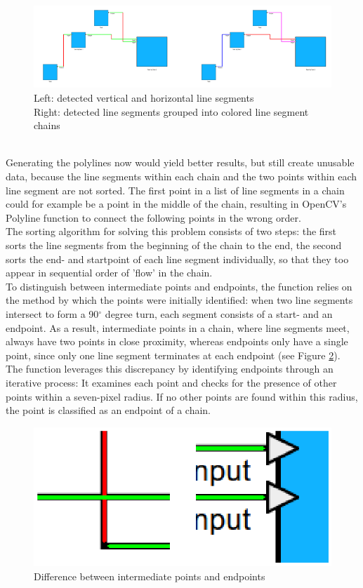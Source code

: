 \begin{figure}[h]
    \centering
    \includegraphics[width=\linewidth]{Pictures/chains_before_after.png}
    \caption{Left: detected vertical and horizontal line segments\\Right: detected line segments grouped into colored line segment chains}
    \label{fig_chains_before_after}
\end{figure}\\
Generating the polylines now would yield better results, but still create unusable data, because the line segments within each chain and the two points within each line segment are not sorted. The first point in a list of line segments in a chain could for example be a point in the middle of the chain, resulting in OpenCV's Polyline function to connect the following points in the wrong order.\\
The sorting algorithm for solving this problem consists of two steps: the first sorts the line segments from the beginning of the chain to the end, the second sorts the end- and startpoint of each line segment individually, so that they too appear in sequential order of 'flow' in the chain.\\
To distinguish between intermediate points and endpoints, the function relies on the method by which the points were initially identified: when two line segments intersect to form a 90$^{\circ}$ degree turn, each segment consists of a start- and an endpoint. As a result, intermediate points in a chain, where line segments meet, always have two points in close proximity, whereas endpoints only have a single point, since only one line segment terminates at each endpoint (see Figure \ref{fig_point_zoom}).
The function leverages this discrepancy by identifying endpoints through an iterative process: It examines each point and checks for the presence of other points within a seven-pixel radius. If no other points are found within this radius, the point is classified as an endpoint of a chain.\\
\begin{figure}
    \centering
    \includegraphics[width=0.5\linewidth]{Pictures/zoomed_in_points.png}
    \caption{Difference between intermediate points and endpoints}
    \label{fig_point_zoom}
\end{figure}

